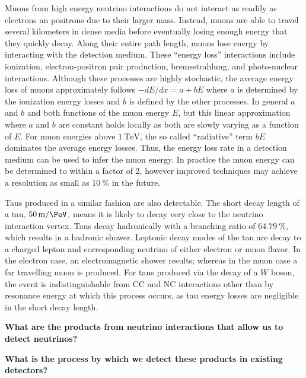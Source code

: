Muons from high energy neutrino interactions do not interact as readily as electrons an positrons due to their larger mass.
Instead, muons are able to travel several kilometers in dense media before eventually losing enough energy that they quickly decay.
Along their entire path length, muons lose energy by interacting with the detection medium.
These ``energy loss'' interactions include ionization, electron-positron pair production, bremsstrahlung, and photo-nuclear interactions.
Although these processes are highly stochastic, the average energy loss of muons approximately follows $-dE/dx=a+bE$ where $a$ is determined by the ionization energy losses and $b$ is defined by the other processes.
In general $a$ and $b$ and both functions of the muon energy $E$, but this linear approximation where $a$ and $b$ are constant holds locally as both are slowly varying as a function of $E$.
For muon energies above $\SI{1}\TeV$, the so called ``radiative'' term $bE$ dominates the average energy losses.
Thus, the energy loss rate in a detection medium can be used to infer the muon energy.
In practice the muon energy can be determined to within a factor of $2$, however improved techniques may achieve a resolution as small as $\SI{10}\percent$ in the future.

Taus produced in a similar fashion are also detectable.
The short decay length of a tau, $\SI{50}\meter / \si\PeV$, means it is likely to decay very close to the neutrino interaction vertex.
Taus decay hadronically with a branching ratio of $\SI{64.79}\percent$, which results in a hadronic shower.
Leptonic decay modes of the tau are decay to a charged lepton and corresponding neutrino of either electron or muon flavor.
In the electron case, an electromagnetic shower results; whereas in the muon case a far travelling muon is produced.
For taus produced via the decay of a $W$ boson, the event is indistinguishable from CC and NC interactions other than by resonance energy at which this process occurs, as tau energy losses are negligible in the short decay length.


\textbf{What are the products from neutrino interactions that allow us to detect neutrinos?}

\textbf{What is the process by which we detect these products in existing detectors?}



